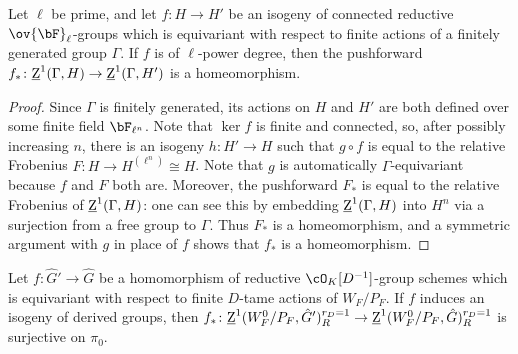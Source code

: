 \begin{lemma}\label{lemma:pushforward-surj}
    Let $\ell$ be prime, and let $f\colon H \to H'$ be an isogeny of connected reductive $\ov{\bF}_\ell$-groups which is equivariant with respect to finite actions of a finitely generated group $\Gamma$. If $f$ is of $\ell$-power degree, then the pushforward $f_*\colon \underline{\rm{Z}}^1(\Gamma, H) \to \underline{\rm{Z}}^1(\Gamma, H')$ is a homeomorphism.
\end{lemma}

\begin{proof}
    Since $\Gamma$ is finitely generated, its actions on $H$ and $H'$ are both defined over some finite field $\bF_{\ell^n}$. Note that $\ker f$ is finite and connected, so, after possibly increasing $n$, there is an isogeny $h\colon H' \to H$ such that $g \circ f$ is equal to the relative Frobenius $F\colon H \to H^{(\ell^n)} \cong H$. Note that $g$ is automatically $\Gamma$-equivariant because $f$ and $F$ both are. Moreover, the pushforward $F_*$ is equal to the relative Frobenius of $\underline{\rm{Z}}^1(\Gamma, H)$: one can see this by embedding $\underline{\rm{Z}}^1(\Gamma, H)$ into $H^n$ via a surjection from a free group to $\Gamma$. Thus $F_*$ is a homeomorphism, and a symmetric argument with $g$ in place of $f$ shows that $f_*$ is a homeomorphism.
\end{proof}


\begin{lemma}\label{lemma:reduction-sssc}
    Let $f\colon \hat{G}' \to \hat{G}$ be a homomorphism of reductive $\cO_K[D^{-1}]$-group schemes which is equivariant with respect to finite $D$-tame actions of $W_F/P_F$. If $f$ induces an isogeny of derived groups, then $f_*\colon \underline{\rm{Z}}^1(W_F^0/P_F, \hat{G}')^{r_D = 1}_R \to \underline{\rm{Z}}^1(W_F^0/P_F, \hat{G})^{r_D = 1}_R$ is surjective on $\pi_0$.
\end{lemma}

